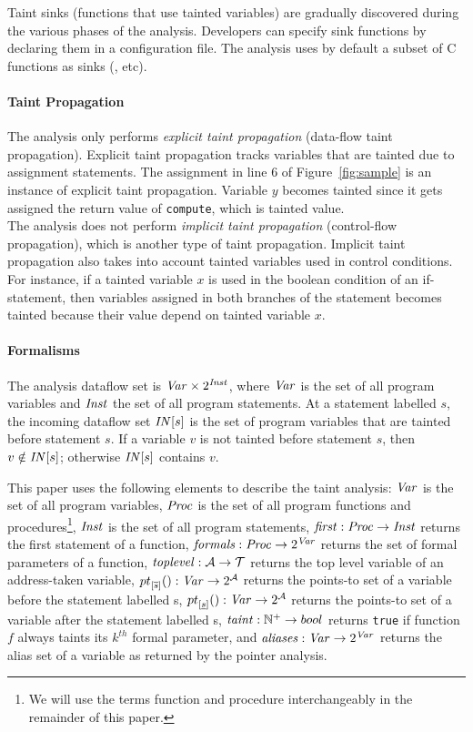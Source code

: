 Taint sinks (functions that use tainted variables) are gradually
discovered during the various phases of the analysis. Developers
can specify sink functions by declaring them in a configuration
file. The analysis uses by default a subset of C functions as
sinks ({\tt  }, etc).

\paragraph{Taint Propagation}
The analysis only performs \textit{explicit taint propagation}
(data-flow taint propagation). Explicit taint propagation tracks variables
that are tainted due to assignment statements. The assignment in line $6$
of Figure~\ref{fig:sample} is an instance of explicit taint propagation.
Variable $y$ becomes tainted since it gets assigned the return value of
\texttt{compute}, which is tainted value.\\
The analysis does not perform \textit{implicit taint propagation}
(control-flow propagation), which is another type of taint propagation.
Implicit taint propagation also takes into account tainted variables
used in control conditions. For instance, if a tainted variable $x$ is
used in the boolean condition of an if-statement, then variables
assigned in both branches of the statement becomes tainted because
their value depend on tainted variable $x$.

\paragraph{Formalisms}
The analysis dataflow set is $\mathit{Var} \times 2^\mathit{Inst}$,
where $\mathit{Var}$ is the set of all program variables and
$\mathit{Inst}$ the set of all program statements. 
At a statement labelled $s$, the incoming dataflow set $\mathit{IN}[s]$
is the set of program variables that are tainted before statement $s$.
If a variable $v$ is not tainted before statement $s$, then
$v \notin \mathit{IN}[s]$; otherwise $\mathit{IN}[s]$ contains $v$.

This paper uses the following elements to describe the
taint analysis:
$\mathit{Var}$ is the set of all program variables,
$\mathit{Proc}$ is the set of all program functions and procedures\footnote{We
will use the terms function and procedure interchangeably in
the remainder of this paper.},
$\mathit{Inst}$ is the set of all program statements,
$\mathit{first}{}: \mathit{Proc} \rightarrow \mathit{Inst}$ returns the first
statement of a function,
$\mathit{formals}{}: \mathit{Proc} \rightarrow 2^{\mathit{Var}}$ returns the
set of formal parameters of a function, 
$\mathit{toplevel}{}: \mathcal{A} \rightarrow \mathcal{T}$ returns the top level
variable of an address-taken variable,
${pt}_{[\overline{s}] }(): \mathit{Var} \rightarrow 2^\mathcal{A}$ returns the
points-to set of a variable before the statement labelled s, 
${pt}_{[\underline{s}]}(): \mathit{Var} \rightarrow 2^\mathcal{A}$ returns the
points-to set of a variable after the statement labelled s,
$\mathit{taint}: \mathbb{N}^+ \rightarrow bool$ returns \texttt{true}
if function $f$ always taints its $k^{th}$ formal parameter, and
$\mathit{aliases}: \mathit{Var} \rightarrow 2^\mathit{Var}$ returns the alias set of
a variable as returned by the pointer analysis.

